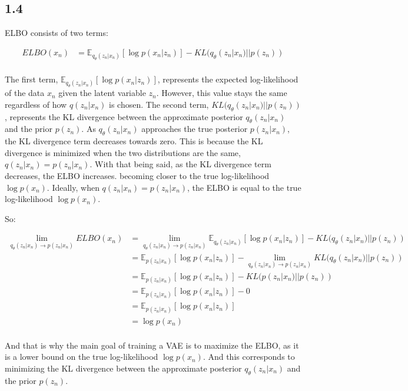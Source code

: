 \documentclass{article}
\begin{document}
\newpage
\subsection*{1.4}

ELBO consists of two terms: 

\begin{align*}
    ELBO(x_n) &= \mathbb{E}_{q_{\theta}(z_n|x_n)}[\log p(x_n|z_n)] - KL(q_{\theta}(z_n|x_n) || p(z_n)) \\
\end{align*}

The first term, $\mathbb{E}_{q_{\theta}(z_n|x_n)}[\log p(x_n|z_n)]$, represents the expected log-likelihood of the data $x_n$ given the latent variable $z_n$.
However, this value stays the same regardless of how $q(z_n|x_n)$ is chosen.
The second term, $KL(q_{\theta}(z_n|x_n) || p(z_n))$, represents the KL divergence between the approximate posterior $q_{\theta}(z_n|x_n)$ and the prior $p(z_n)$.
As $q_{\theta}(z_n|x_n)$ approaches the true posterior $p(z_n|x_n)$, the KL divergence term decreases towards zero. This
is because the KL divergence is minimized when the two distributions are the same, $q(z_n|x_n) = p(z_n|x_n)$.
With that being said, as the KL divergence term decreases, the ELBO increases. becoming closer to the true log-likelihood $\log p(x_n)$.
Ideally, when $q(z_n|x_n) = p(z_n|x_n)$, the ELBO is equal to the true log-likelihood $\log p(x_n)$.

So: 

\begin{align*}
    \lim_{q_{\theta}(z_n|x_n) \rightarrow p(z_n|x_n)} ELBO(x_n) &= \lim_{q_{\theta}(z_n|x_n) \rightarrow p(z_n|x_n)} \mathbb{E}_{q_{\theta}(z_n|x_n)}[\log p(x_n|z_n)] - KL(q_{\theta}(z_n|x_n) || p(z_n)) \\
    &= \mathbb{E}_{p(z_n|x_n)}[\log p(x_n|z_n)] - \lim_{q_{\theta}(z_n|x_n) \rightarrow p(z_n|x_n)} KL(q_{\theta}(z_n|x_n) || p(z_n)) \\
    &= \mathbb{E}_{p(z_n|x_n)}[\log p(x_n|z_n)] - KL(p(z_n|x_n) || p(z_n)) \\
    &= \mathbb{E}_{p(z_n|x_n)}[\log p(x_n|z_n)] - 0 \\
    &= \mathbb{E}_{p(z_n|x_n)}[\log p(x_n|z_n)] \\
    &= \log p(x_n) \\
\end{align*}

And that is why the main goal of training a VAE is to maximize the ELBO, as it is a lower bound on the true log-likelihood $\log p(x_n)$.
And this corresponds to minimizing the KL divergence between the approximate posterior $q_{\theta}(z_n|x_n)$ and the prior $p(z_n)$.
\end{document}
